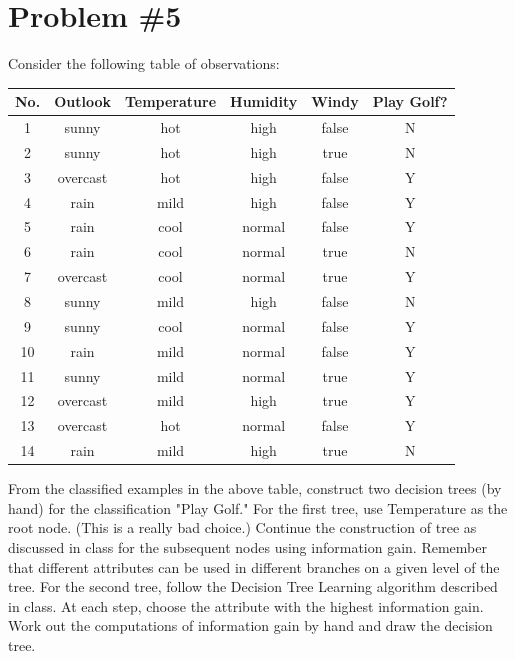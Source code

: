 \documentclass[12pt]{article}
\begin{document}
	\section*{Problem \#5}
	Consider the following table of observations:
	\begin{center}
		\begin{tabular*}{340pt}[t]{c | c c c c | c}
			No. & Outlook & Temperature & Humidity & Windy & Play Golf? \\
			\hline \hline
			1 & sunny & hot & high & false & N \\
			2 & sunny & hot & high & true & N \\
			3 & overcast & hot & high & false & Y \\
			4 & rain & mild & high & false & Y \\
			5 & rain & cool & normal & false & Y \\
			6 & rain & cool & normal & true & N \\
			7 & overcast & cool & normal & true & Y \\
			8 & sunny & mild & high & false & N \\
			9 & sunny & cool & normal & false & Y \\
			10 & rain & mild & normal & false & Y \\
			11 & sunny & mild & normal & true & Y \\
			12 & overcast & mild & high & true & Y \\
			13 & overcast & hot & normal & false & Y \\
			14 & rain & mild & high & true & N \\
		\end{tabular*}
	\end{center}
	From the classified examples in the above table, construct two decision trees (by hand) for the classification "Play Golf." For the  first tree, use Temperature as the root node. (This  is
	a really bad  choice.) Continue the construction  of  tree  as  discussed  in  class  for  the  subsequent  nodes using information  gain. Remember  that different attributes can be used in different branches on a given level of the tree. For the second tree, follow the  Decision Tree Learning  algorithm described  in class. At  each step,  choose  the  attribute  with  the  highest information gain. Work out the computations of information gain by hand and draw the decision tree.\\
	
\end{document}
